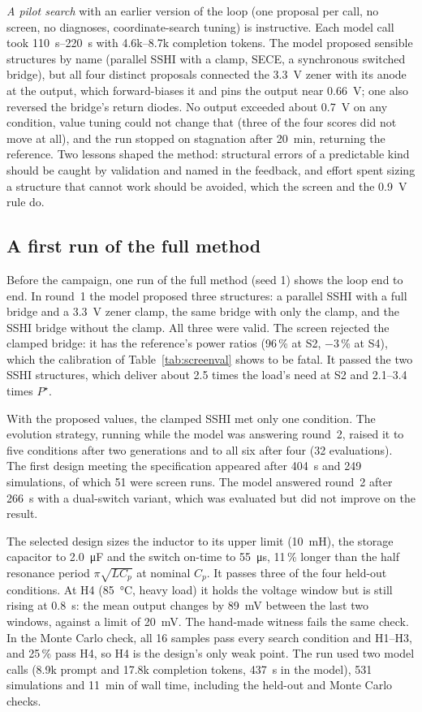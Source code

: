 \documentclass[journal]{IEEEtran}
\begin{document}
\emph{A pilot search} with an earlier version of the loop (one proposal per call, no screen, no diagnoses,
coordinate-search tuning) is instructive. Each model call took \SIrange{110}{220}{s} with 4.6k--8.7k
completion tokens. The model proposed sensible structures by name (parallel SSHI with a clamp, SECE,
a synchronous switched bridge), but all four distinct proposals connected the \SI{3.3}{V} zener with its
anode at the output, which forward-biases it and pins the output near \SI{0.66}{V}; one also reversed the
bridge's return diodes. No output exceeded about \SI{0.7}{V} on any condition, value tuning could not
change that (three of the four scores did not move at all), and the run stopped on stagnation after
\SI{20}{min}, returning the reference. Two lessons shaped the method: structural
errors of a predictable kind should be caught by validation and named in the feedback, and effort spent
sizing a structure that cannot work should be avoided, which the screen and the \SI{0.9}{V} rule do.

\subsection{A first run of the full method}\label{sec:single}
Before the campaign, one run of the full method (seed 1) shows the loop end to end. In round~1 the model
proposed three structures: a parallel SSHI with a full bridge and a \SI{3.3}{V} zener clamp, the same
bridge with only the clamp, and the SSHI bridge without the clamp. All three were valid. The screen
rejected the clamped bridge: it has the reference's power ratios (96\,\% at S2, $-3$\,\% at S4), which the
calibration of Table~\ref{tab:screenval} shows to be fatal. It passed the two SSHI structures, which
deliver about 2.5 times the load's need at S2 and 2.1--3.4 times $P^\star$.

With the proposed values, the clamped SSHI met only one condition. The evolution strategy, running while
the model was answering round~2, raised it to five conditions after two generations and to all six after
four (32 evaluations). The first design meeting the specification appeared after \SI{404}{s} and 249
simulations, of which 51 were screen runs. The model answered round~2 after \SI{266}{s} with a
dual-switch variant, which was evaluated but did not improve on the result.

The selected design sizes the inductor to its upper limit (\SI{10}{mH}), the storage capacitor to
\SI{2.0}{\micro F} and the switch on-time to \SI{55}{\micro s}, 11\,\% longer than the half resonance
period $\pi\sqrt{L C_p}$ at nominal $C_p$. It passes three of the four held-out conditions. At H4
(\SI{85}{\celsius}, heavy load) it holds the voltage window but is still rising at \SI{0.8}{s}: the mean
output changes by \SI{89}{mV} between the last two windows, against a limit of \SI{20}{mV}. The hand-made
witness fails the same check. In the Monte Carlo check, all 16 samples pass every search condition and
H1--H3, and 25\,\% pass H4, so H4 is the design's only weak point. The run used two model calls (8.9k
prompt and 17.8k completion tokens, \SI{437}{s} in the model), 531 simulations and \SI{11}{min} of wall
time, including the held-out and Monte Carlo checks.
\end{document}
